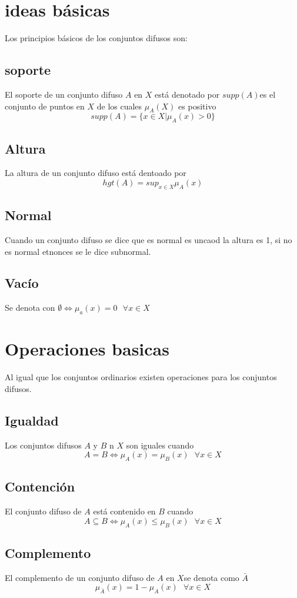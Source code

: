 \documentclass{article}
\begin{document}
\section{ideas básicas}
Los principios básicos de los conjuntos difusos son:
\subsection{soporte}
El soporte de un conjunto difuso $A$ en $X$  está denotado por  $supp(A)$es el conjunto de puntos en $X$ de los cuales $\mu_A(X)$ es positivo
$$supp(A)=\{x\in X | \mu_A (x)>0\}$$
\subsection{Altura}
La altura de un conjunto difuso está dentoado por 
$$hgt(A)=sup_{x\in X} \mu_A(x)$$
\subsection{Normal}
Cuando un conjunto difuso se dice que es normal es uncaod la altura es 1, si no es normal etnonces se le dice subnormal.
\subsection{Vacío}
Se denota con $\emptyset \Longleftrightarrow \mu_a(x)=0 \text{  }\forall x \in X$   
\section{Operaciones basicas}
Al igual que los conjuntos ordinarios existen operaciones para los conjuntos difusos.
\subsection{Igualdad}
Los conjuntos difusos $A$ y $B$ n $X$ son iguales cuando $$A=B \Longleftrightarrow  \mu_A(x)=\mu_B(x)\text{  } \forall x\in X$$ 
\subsection{Contención}
El conjunto difuso de $A$ está contenido en $B$ cuando
$$A \subseteq B \Longleftrightarrow \mu_A(x) \leq \mu_B(x) \text{  }\forall x\in X$$
\subsection{Complemento}
El complemento de un conjunto difuso de $A$ en $X$se denota como $\bar{A}$
$$\mu_{\bar{A}}(x)=1-\mu_A(x)\text{  } \forall x \in X$$
\end{document}
